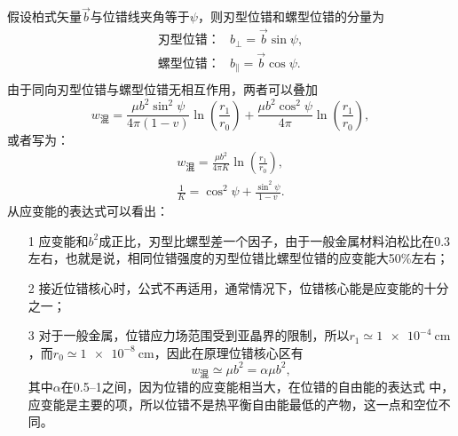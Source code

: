             假设柏式矢量$\vec{b}$与位错线夹角等于$\psi$，则刃型位错和螺型位错的分量为
            \begin{align}
                \text{刃型位错：}&b_\perp=\vec{b}\sin\psi,\\
                \text{螺型位错：}&b_\parallel=\vec{b}\cos\psi.\\                
            \end{align}
            由于同向刃型位错与螺型位错无相互作用，两者可以叠加
            \begin{equation}
                w_{\text{混}}=\frac{\mu b^{2} \sin ^{2} \psi}{4 \pi(1-v)} \ln \left(\frac{r_{1}}{r_{0}}\right)+\frac{\mu b^{2} \cos ^{2} \psi}{4 \pi} \ln \left(\frac{r_{1}}{r_{0}}\right),
            \end{equation}
            或者写为：
            \begin{align}
                w_{\text{混}}=\frac{\mu b^{2}}{4 \pi K} \ln \left(\frac{r_{1}}{r_{0}}\right),\\
                \frac{1}{K}=\cos^2\psi+\frac{\sin^2\psi}{1-v}.
            \end{align}
            从应变能的表达式可以看出：
            \begin{itemize}
                \item[1] 应变能和$b^2$成正比，刃型比螺型差一个因子，由于一般金属材料泊松比在0.3左右，也就是说，相同位错强度的刃型位错比螺型位错的应变能大50\%左右；
                \item[2] 接近位错核心时，公式不再适用，通常情况下，位错核心能是应变能的十分之一；
                \item[3] 对于一般金属，位错应力场范围受到亚晶界的限制，所以$r_1\simeq\SI{1e-4}{\cm}$，而$r_0\simeq\SI{1e-8}{\cm}$，因此在原理位错核心区有
                \begin{equation}
                    w_{\text{混}}\simeq\mu b^2=\alpha\mu b^2,
                \end{equation} 
                其中$\alpha$在\numrange{0.5}{1}之间，因为位错的应变能相当大，在位错的自由能的表达式
                中，应变能是主要的项，所以位错不是热平衡自由能最低的产物，这一点和空位不
                同。
            \end{itemize}
